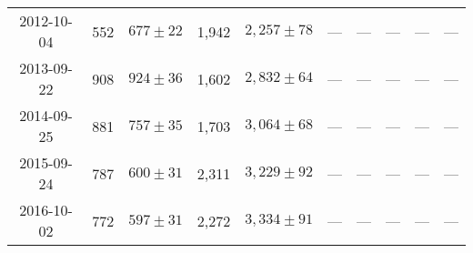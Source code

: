 \begin{landscape}
\begin{longtable}{cccccccccc}
{2012-10-04} & 552 & {$677  \pm  22$} & 1,942 & {$2,257 \pm 78$} & --- & --- & --- & --- & --- \\
{2013-09-22} & 908 & {$924  \pm  36$} & 1,602 & {$2,832 \pm 64$} & --- & --- & --- & --- & --- \\
{2014-09-25} & 881 & {$757  \pm  35$} & 1,703 & {$3,064 \pm 68$} & --- & --- & --- & --- & --- \\
{2015-09-24} & 787 & {$600  \pm  31$} & 2,311 & {$3,229 \pm 92$} & --- & --- & --- & --- & --- \\
{2016-10-02} & 772 & {$597  \pm  31$} & 2,272 & {$3,334 \pm 91$} & --- & --- & --- & --- & --- \\
\end{longtable} 
\end{landscape} 
